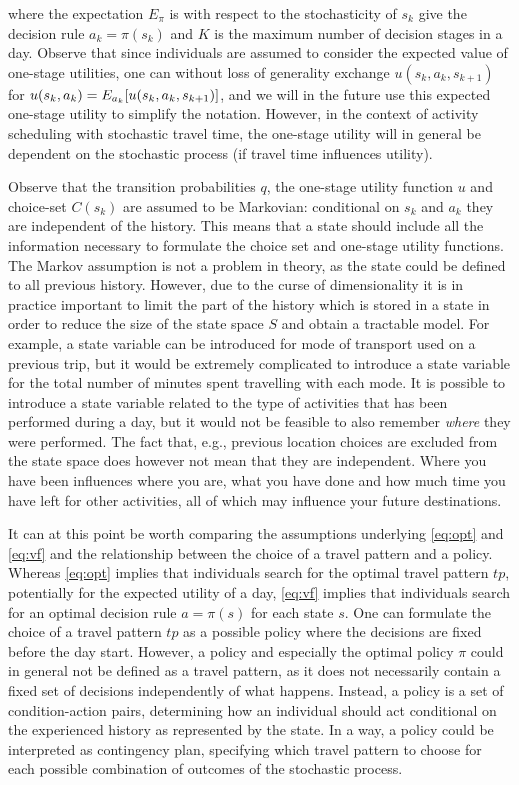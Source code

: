 where the expectation $E_\pi$ is with respect to the stochasticity of $s_k$ give the decision rule $a_k=\pi({s_k})$ and $K$ is the maximum number of decision stages in a day. Observe that since individuals are assumed to consider the expected value of one-stage utilities, one can without loss of generality exchange $u(s_k,a_k,s_{k+1})$ for $u(s_k,a_k) = E_{a_k}[u(s_k,a_k,s_{k+1})]$, and we will in the future use this expected one-stage utility to simplify the notation. However, in the context of activity scheduling with stochastic travel time, the one-stage utility will in general be dependent on the stochastic process (if travel time influences utility).

Observe that the transition probabilities $q$, the one-stage utility function $u$ and choice-set $C(s_k)$ are assumed to be Markovian: conditional on $s_k$ and $a_k$ they are independent of the history. This means that a state should include all the information necessary to formulate the choice set and one-stage utility functions. The Markov assumption is not a problem in theory, as the state could be defined to all previous history. However, due to the curse of dimensionality it is in practice important to limit the part of the history which is stored in a state in order to reduce the size of the state space $S$ and obtain a tractable model. For example, a state variable can be introduced for mode of transport used on a previous trip, but it would be extremely complicated to introduce a state variable for the total number of minutes spent travelling with each mode. It is possible to introduce a state variable related to the type of activities that has been performed during a day, but it would not be feasible to also remember \emph{where} they were performed. The fact that, e.g., previous location choices are excluded from the state space does however not mean that they are independent. Where you have been influences where you are, what you have done and how much time you have left for other activities, all of which may influence your future destinations. 

It can at this point be worth comparing the assumptions underlying \eqref{eq:opt} and \eqref{eq:vf} and the relationship between the choice of a travel pattern and a policy. Whereas \eqref{eq:opt} implies that individuals search for the optimal travel pattern $tp$, potentially for the expected utility of a day, \eqref{eq:vf} implies that individuals search for an optimal decision rule $a = \pi(s)$ for each state $s$. One can formulate the choice of a travel pattern $tp$ as a possible policy where the decisions are fixed before the day start. However, a policy and especially the optimal policy $\pi$ could in general not be defined as a travel pattern, as it does not necessarily contain a fixed set of decisions independently of what happens. Instead, a policy is a set of condition-action pairs, determining how an individual should act conditional on the experienced history as represented by the state. In a way, a policy could be interpreted as contingency plan, specifying which travel pattern to choose for each possible combination of outcomes of the stochastic process.


